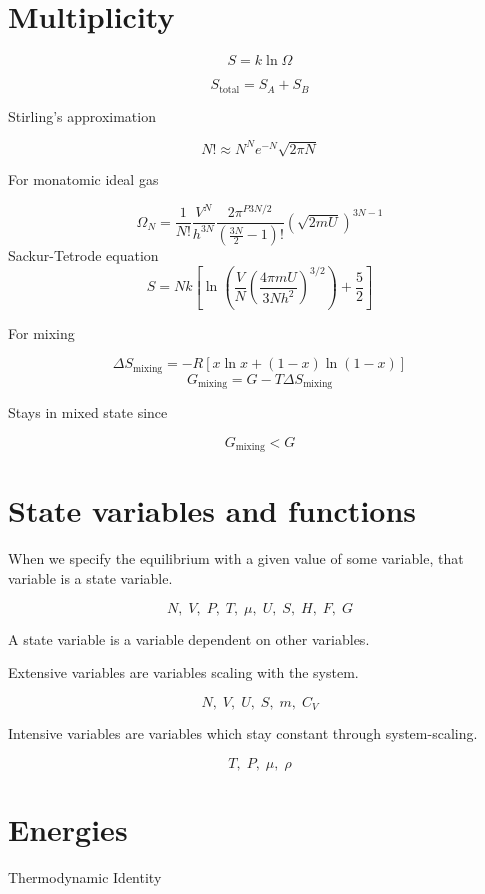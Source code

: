 \documentclass[reprint,english,notitlepage]{revtex4-1}  %
\begin{document}
\section*{Multiplicity}

\begin{equation}
S = k \ln{\Omega}
\end{equation}

$$ S_{\text{total}} = S_A + S_B$$

Stirling's approximation

$$N! \approx N^Ne^{-N}\sqrt{2 \pi N}$$

For monatomic ideal gas


$$\Omega_N = \frac{1}{N!} \frac{V^N}{h^{3N}} \frac{2\pi^{P3N/2}}{(\frac{3N}{2} - 1 )!} \left ( \sqrt{2mU} \right ) ^{3N - 1}$$
Sackur-Tetrode equation
$$S = Nk\left [ \ln{ \left ( \frac{V}{N} \left ( \frac{4\pi mU}{3Nh^2} \right ) ^{3/2} \right )} + \frac{5}{2} \right ]$$

For mixing

$$\Delta{S}_{\text{mixing}} = -R[x \ln x + (1-x)\ln(1-x)]$$
$$G_{\text{mixing}} = G - T\Delta{S}_{\text{mixing}}$$

Stays in mixed state since

$$G_{\text{mixing}} < G$$
\section*{State variables and functions}

When we specify the equilibrium with a given value of some variable, that variable is a state variable.

$$ N, \; V, \; P , \; T , \; \mu, \; U, \; S , \; H, \; F, \; G $$ 

A state variable is a variable dependent on other variables.

Extensive variables are variables scaling with the system.

$$N, \; V, \; U , \; S , \; m, \; C_V $$

Intensive variables are variables which stay constant through system-scaling.

$$T, \; P, \; \mu, \; \rho$$

\section*{Energies}

\begin{center}
Thermodynamic Identity
\end{center}
\end{document}
